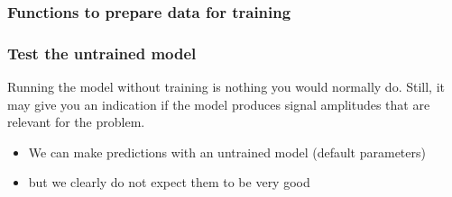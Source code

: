 \documentclass[letterpaper,10pt,english]{sphinxmanual}
\begin{document}
\subsubsection{Functions to prepare data for training}
\label{\detokenize{ML4NeutronImageSegmentation:functions-to-prepare-data-for-training}}
\begin{sphinxVerbatim}[commandchars=\\\{\}]
   
      


   
     \PYG{p}{[} \PYG{p}{]} 
\end{sphinxVerbatim}


\subsubsection{Test the untrained model}
\label{\detokenize{ML4NeutronImageSegmentation:test-the-untrained-model}}
Running the model without training is nothing you would normally do. Still, it may give you an indication if the model produces signal amplitudes that are relevant for the problem.
\begin{itemize}
\item {} 
We can make predictions with an untrained model (default parameters)

\item {} 
but we clearly do not expect them to be very good

\end{itemize}

\begin{sphinxVerbatim}[commandchars=\\\{\}]
  \PYG{p}{[}   \PYG{p}{]}
\end{sphinxVerbatim}
\end{document}
